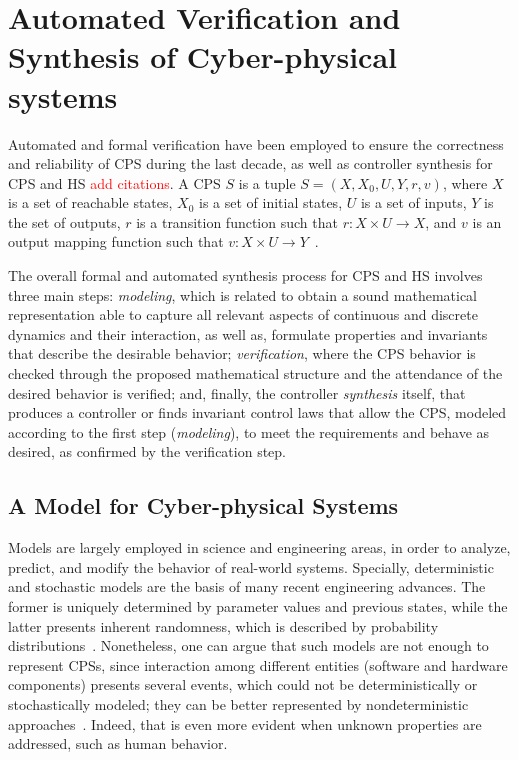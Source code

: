 \documentclass[format=acmsmall, review=false, screen=true]{acmart}
\begin{document}
\section{Automated Verification and Synthesis of Cyber-physical systems}
\label{sec:model}

Automated and formal verification have been employed to ensure the correctness and reliability of CPS during the last decade, as well as controller synthesis for CPS and HS \textcolor{red}{add citations}. A CPS $S$ is a tuple $S=(X,X_{0},U,Y,r,v)$, where $X$ is a set of reachable states, $X_{0}$ is a set of initial states, $U$ is a set of inputs, $Y$ is the set of outputs, $r$ is a transition function such that $r:X\times U \rightarrow X$, and  $v$ is an output mapping function such that $v:X\times U \rightarrow Y$~\cite{Rungger16,Alur00,Girard11}.

The overall formal and automated synthesis process for CPS and HS involves three main steps: \textit{modeling}, which is related to obtain a sound mathematical representation able to capture all relevant aspects of continuous and discrete dynamics and their interaction, as well as, formulate properties and invariants that describe the desirable behavior; \textit{verification}, where the CPS behavior is checked through the proposed mathematical structure and the attendance of the desired behavior is verified; and, finally, the controller \textit{synthesis} itself, that produces a controller or finds invariant control laws that allow the CPS, modeled according to the first step (\textit{modeling}), to meet the requirements and behave as desired, as confirmed by the verification step. 


\subsection{A Model for Cyber-physical Systems}
\label{ssec:model}

Models are largely employed in science and engineering areas, in order to analyze, predict, and modify the behavior of real-world systems. Specially, deterministic and stochastic models are the basis of many recent engineering advances. The former is uniquely determined by parameter values and previous states, while the latter presents inherent randomness, which is described by probability distributions~\cite{stochmodel}. Nonetheless, one can argue that such models are not enough to represent CPSs, since interaction among different entities (software and hardware components) presents several events, which could not be deterministically or stochastically modeled; they can be better represented by nondeterministic approaches~\cite{leeCPS2}. Indeed, that is even more evident when unknown properties are addressed, such as human behavior.
\end{document}
